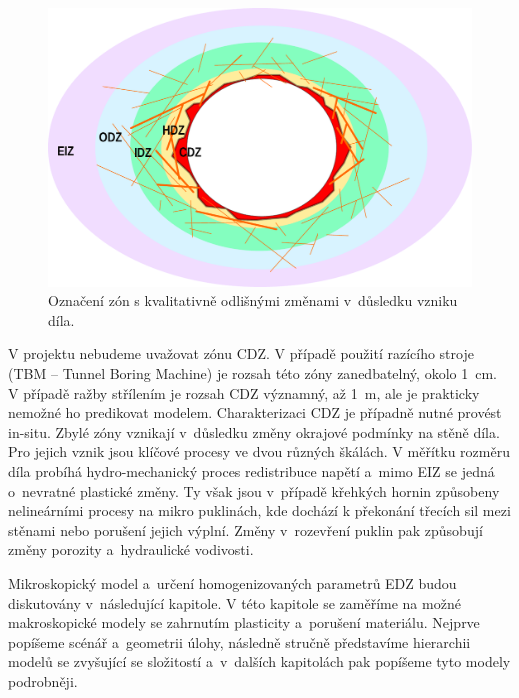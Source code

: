 \documentclass{article}
\newcommand{\js}[1]{}
\begin{document}

\begin{figure}
    \centering
    \includegraphics[width=\textwidth]{graphics/EDZ_structure.pdf}
    \caption{Označení zón s kvalitativně odlišnými změnami v~důsledku vzniku díla.}
    \label{fig:edz_zones}
\end{figure}

V projektu nebudeme uvažovat zónu CDZ. V případě použití razícího stroje (TBM -- Tunnel Boring Machine) je rozsah této zóny zanedbatelný, okolo 1~cm. V případě 
ražby střílením je rozsah CDZ významný, až 1~m, ale je prakticky nemožné ho predikovat modelem. Charakterizaci CDZ je případně nutné provést in-situ.
Zbylé zóny vznikají v~důsledku změny okrajové podmínky na stěně díla. Pro jejich vznik jsou klíčové procesy ve dvou různých škálách. V měřítku rozměru 
díla probíhá hydro-mechanický proces redistribuce napětí a~mimo EIZ se jedná o~nevratné plastické změny. Ty však jsou v~případě křehkých hornin
způsobeny nelineárními procesy na mikro puklinách, kde dochází k překonání třecích sil mezi stěnami nebo porušení jejich výplní. 
Změny v~rozevření puklin pak způsobují změny porozity a~hydraulické vodivosti. 

Mikroskopický model a~určení homogenizovaných parametrů EDZ budou diskutovány v~následující kapitole.
V této kapitole se zaměříme na možné makroskopické modely se zahrnutím plasticity a~porušení materiálu.
Nejprve popíšeme scénář a~geometrii úlohy, následně stručně představíme hierarchii modelů se zvyšující se složitostí
a~v~dalších kapitolách pak popíšeme tyto modely podrobněji.
\end{document}
